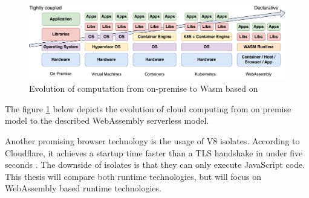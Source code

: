 \begin{figure}[H]
	\centering
		\includegraphics[width=\textwidth,height=\textheight,keepaspectratio]{images/introduction/Cloud_Transformation.pdf}
	\caption{Evolution of computation from on-premise to Wasm based on \cite{randall_2021_wasmcloud}}
	\label{fig:cloud-transformation}
\end{figure}

The figure \ref{fig:cloud-transformation} below depicts the evolution of \gls{cloud computing} from on premise model to the described WebAssembly serverless model.

Another promising browser technology is the usage of V8 \glspl{isolate}. According to Cloudflare, it achieves a startup time faster than a TLS handshake in under five seconds \cite{partovi_2020_eliminating}. The downside of isolates is that they can only execute JavaScript code. This thesis will compare both runtime technologies, but will focus on WebAssembly based runtime technologies.